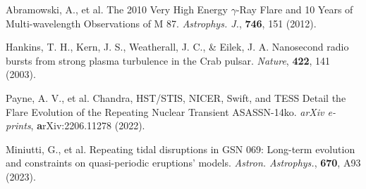 \documentclass{nature_plusfigure}
\newcommand{\apj}{{Astrophys. J.}}
\newcommand{\aap}{{Astron. Astrophys.}}
\newcommand{\nat}{{Nature}}
\newcommand{\araa}{Annual Review of Astronomy and Astrophysics}
\begin{document}
\begin{thebibliography}{100}
 Abramowski, A., et al. The 2010 Very High Energy $\gamma$-Ray Flare and 10 Years of Multi-wavelength Observations of M 87. \emph{\apj}, \textbf{746}, 151 (2012). 

 Hankins, T. H., Kern, J. S., Weatherall, J. C., \& Eilek, J. A. Nanosecond radio bursts from strong plasma turbulence in the Crab pulsar. \emph{\nat}, \textbf{422}, 141 (2003). 

 Payne, A. V., et al. Chandra, HST/STIS, NICER, Swift, and TESS Detail the Flare Evolution of the Repeating Nuclear Transient ASASSN-14ko. \emph{arXiv e-prints}, \textbf arXiv:2206.11278 (2022). 

 Miniutti, G., et al. Repeating tidal disruptions in GSN 069: Long-term evolution and constraints on quasi-periodic eruptions' models. \emph{\aap}, \textbf{670}, A93 (2023). 

%
%
%


\end{thebibliography}
\end{document}
